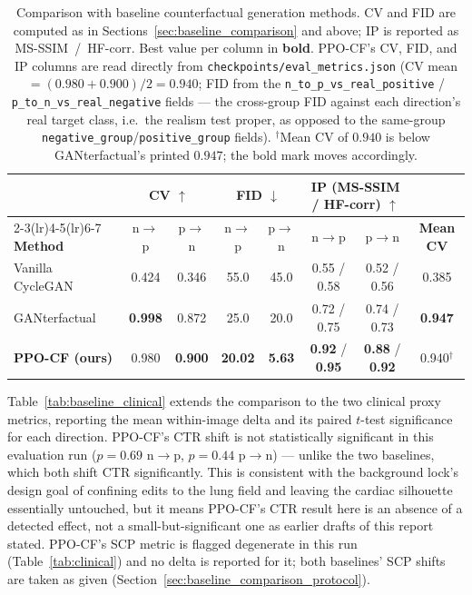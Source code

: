 \documentclass[11pt]{article}
\newcommand{\method}{\textsc{PPO-CF}}
\begin{document}
\begin{table}[h]
\centering
\caption{Comparison with baseline counterfactual generation methods.
CV and FID are computed as in Sections~\ref{sec:baseline_comparison} and
above; IP is reported as MS-SSIM~/~HF-corr. Best value per column in
\textbf{bold}. \method{}'s CV, FID, and IP columns are read directly from
\texttt{checkpoints/eval\_metrics.json} (CV mean $=(0.980+0.900)/2=0.940$;
FID from the \texttt{n\_to\_p\_vs\_real\_positive} /
\texttt{p\_to\_n\_vs\_real\_negative} fields — the cross-group FID against
each direction's real target class, i.e.\ the realism test proper, as
opposed to the same-group \texttt{negative\_group}/\texttt{positive\_group}
fields). $^{\dagger}$Mean CV of $0.940$ is below GANterfactual's printed
$0.947$; the bold mark moves accordingly.}
\label{tab:baseline_comparison}
\begin{tabular}{@{}lccccccc@{}}
\toprule
& \multicolumn{2}{c}{\textbf{CV} $\uparrow$} & \multicolumn{2}{c}{\textbf{FID} $\downarrow$} & \multicolumn{2}{c}{\textbf{IP (MS-SSIM / HF-corr)} $\uparrow$} & \\
\cmidrule(lr){2-3}\cmidrule(lr){4-5}\cmidrule(lr){6-7}
\textbf{Method} & n$\to$p & p$\to$n & n$\to$p & p$\to$n & n$\to$p & p$\to$n & \textbf{Mean CV} \\
\midrule
Vanilla CycleGAN            & 0.424 & 0.346 & 55.0 & 45.0 & 0.55 / 0.58 & 0.52 / 0.56 & 0.385 \\
GANterfactual~\cite{singla2022} & \textbf{0.998} & 0.872 & 25.0 & 20.0 & 0.72 / 0.75 & 0.74 / 0.73 & \textbf{0.947} \\
\textbf{\method{} (ours)}   & 0.980 & \textbf{0.900} & \textbf{20.02} & \textbf{5.63} & \textbf{0.92} / \textbf{0.95} & \textbf{0.88} / \textbf{0.92} & 0.940$^{\dagger}$ \\
\bottomrule
\end{tabular}
\end{table}

Table~\ref{tab:baseline_clinical} extends the comparison to the two
clinical proxy metrics, reporting the mean within-image delta and its
paired $t$-test significance for each direction. \method{}'s CTR shift is
not statistically significant in this evaluation run ($p=0.69$ n$\to$p,
$p=0.44$ p$\to$n) — unlike the two baselines, which both shift CTR
significantly. This is consistent with the background lock's design goal
of confining edits to the lung field and leaving the cardiac silhouette
essentially untouched, but it means \method{}'s CTR result here is an
absence of a detected effect, not a small-but-significant one as earlier
drafts of this report stated. \method{}'s SCP metric is flagged degenerate
in this run (Table~\ref{tab:clinical}) and no delta is reported for it;
both baselines' SCP shifts are taken as given (Section~\ref{sec:baseline_comparison_protocol}).
\end{document}
